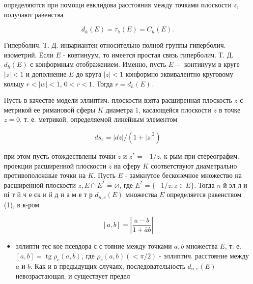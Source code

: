 \documentclass[10pt]{article}
\begin{document}
определяются при помощи евклидова расстояния между точками плоскости $z$, получают равенства



\[

d_{h}(E)=\tau_{h}(E)=C_{h}(E) .

\]



Гиперболич. Т. Д. инвариантен относительно полной группы гиперболич. изометрий. Если $E$ - ковтинуум, то имеется простая связь гиперболич. Т. Д. $d_{h}(E)$ с конформным отображением. Именно, пусть $E-$ континуум в круге $|z|<1$ и дополнение $E$ до круга $|z|<1$ конформно эквивалентно круговому кольцу $r<|w|<1$, $0<r<1$. Тогда $r=d_{h}(E)$.



Пусть в качестве модели эллиптич. плоскости взята расширенная плоскость $z$ с метрикой ее римановой сферы $K$ диаметра 1, касающейся плоскости $z$ в точке $z=0$, т. е. метрикой, определяемой линейным элементом



\[

d s_{e}=|d z| /\left(1+|z|^{2}\right)

\]



при этом пусть отождествлены точки $z$ и $z^{*}=-1 / z$, к-рым при стереографич. проекции расширенной плоскости $z$ на сферу $K$ соответствуют диаметрально противоположные точки на $K$. Пусть $E$ - замкнутое бесконечное множество на расширенной плоскости $z, E \cap E^{*}=\varnothing$, где $E^{*}=\{-1 / z: z \in E\}$. Тогда $n$-й эл л и пі т й ч е ск и й д и а м е т р $d_{n, e}(E)$ множества $E$ определяется равенством (1), в к-ром



\[

[a, b]=\left|\frac{a-b}{1+\bar{a} b}\right|

\]



\begin{itemize}

  \item эллипти тес кое псевдора с с тояние между точками $a, b$ множества $E$, т. е. $[a, b]=\operatorname{tg} \rho_{e}(a, b)$, где $\rho_{e}(a, b)(<\pi / 2)$ - эллиптич. расстояние между $a$ и $b$. Как и в предыдущих случаях, последовательность $d_{n, e}(E)$ невозрастающая, и существует предел

\end{itemize}
\end{document}
